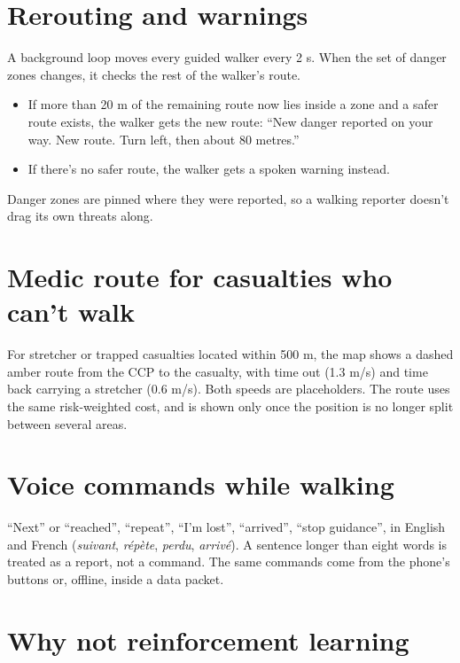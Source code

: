 \section{Rerouting and warnings}

A background loop moves every guided walker every 2 s. When the set of danger zones changes, it checks the
rest of the walker's route.
\begin{itemize}
  \item If more than 20 m of the remaining route now lies inside a zone and a safer route exists, the walker gets
        the new route: ``New danger reported on your way. New route. Turn left, then about 80 metres.''
  \item If there's no safer route, the walker gets a spoken warning instead.
\end{itemize}
Danger zones are pinned where they were reported, so a walking reporter doesn't drag its own threats along.

\section{Medic route for casualties who can't walk}

For stretcher or trapped casualties located within 500 m, the map shows a dashed amber route from the CCP to the
casualty, with time out (1.3 m/s) and time back carrying a stretcher (0.6 m/s). Both speeds are placeholders.
The route uses the same risk-weighted cost, and is shown only once the position is no longer split between
several areas.

\section{Voice commands while walking}

``Next'' or ``reached'', ``repeat'', ``I'm lost'', ``arrived'', ``stop guidance'', in English and French
(\emph{suivant}, \emph{répète}, \emph{perdu}, \emph{arrivé}). A sentence longer than eight words is treated as a
report, not a command. The same commands come from the phone's buttons or, offline, inside a data packet.

\section{Why not reinforcement learning}

